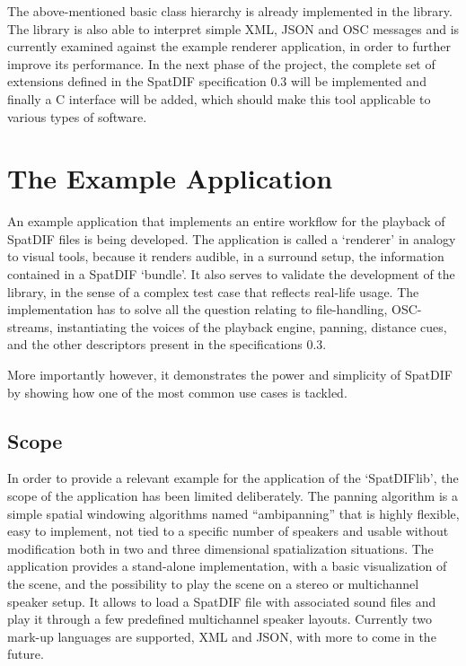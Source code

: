 \documentclass[a4paper]{article}
\begin{document}
The above-mentioned basic class hierarchy is already implemented in the library. 
The library is also able to interpret simple XML, JSON and OSC messages and is currently examined against the example renderer application, in order to further improve its performance.  
In the next phase of the project, the complete set of extensions defined in the SpatDIF specification 0.3 will be implemented and finally a C interface will be added, which should make this tool applicable to various types of software. 

\section{The Example Application}%

An example application that implements an entire workflow for the playback of SpatDIF files is being developed. The application is called a `renderer' in analogy to visual tools, because it renders audible, in a surround setup, the information contained in a SpatDIF `bundle'.
It also serves to validate the development of the library, in the sense of a complex test case that reflects real-life usage.
The implementation has to solve all the question relating to file-handling, OSC-streams, instantiating the voices of the playback engine, panning, distance cues, and the other descriptors present in the specifications 0.3.

More importantly however, it demonstrates the power and simplicity of SpatDIF by showing how one of the most common use cases is tackled.

\subsection{Scope}

In order to provide a relevant example for the application of the `SpatDIFlib', the scope of the application has been limited deliberately.
The panning algorithm is a simple spatial windowing algorithms named ``ambipanning'' \cite{Neukom:2008ambipan} that %
is highly flexible, easy to implement, not tied to a specific number of speakers and usable without modification both in two and three dimensional spatialization situations.
The application provides a stand-alone implementation, with a basic visualization of the scene, and the possibility to play the scene on a stereo or multichannel speaker setup.
It allows to load a SpatDIF file with associated sound files and play it through a few predefined multichannel speaker layouts.
Currently two mark-up languages are supported, XML and JSON, with more to come in the future.
\end{document}
